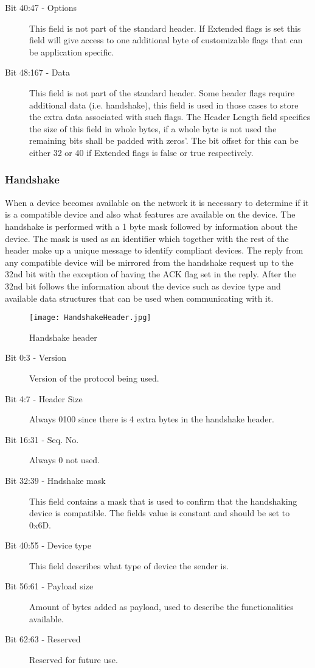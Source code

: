 \begin{description}
\item [Bit 40:47 - Options] This field is not part of the standard header. If Extended flags is set this field will give access to one additional byte of customizable flags that can be application specific.
\item [Bit 48:167 - Data] This field is not part of the standard header. Some header flags require additional data (i.e. handshake), this field is used in those cases to store the extra data associated with such flags. The Header Length field specifies the size of this field in whole bytes, if a whole byte is not used the remaining bits shall be padded with zeros’.
The bit offset for this can be either 32 or 40 if Extended flags is false or true respectively.
\end{description}
\subsubsection*{Handshake}
When a device becomes available on the network it is necessary to determine if it is a compatible device and also what features are available on the device. The handshake is performed with a 1 byte mask followed by information about the device. The mask is used as an identifier which together with the rest of the header make up a unique message to identify compliant devices. The reply from any compatible device will be mirrored from the handshake request up to the 32nd bit with the exception of having the ACK flag set in the reply. After the 32nd bit follows the information about the device such as device type and available data structures that can be used when communicating with it.

\begin{figure}
\centering
\texttt{[image: HandshakeHeader.jpg]}
\caption{Handshake header}
\label{fig:HandshakeHeader}
\end{figure}

\begin{description}
\item [Bit 0:3 - Version] Version of the protocol being used.
\item [Bit 4:7 - Header Size] Always 0100 since there is 4 extra bytes in the handshake header.
\item [Bit 16:31 - Seq. No.] Always 0 not used.
\item [Bit 32:39 - Hndshake mask] This field contains a mask that is used to confirm that the handshaking device is compatible. The fields value is constant and should be set to 0x6D.
\item [Bit 40:55 - Device type] This field describes what type of device the sender is.
\item [Bit 56:61 - Payload size] Amount of bytes added as payload, used to describe the functionalities available. 
\item [Bit 62:63 - Reserved] Reserved for future use.
\end{description}

